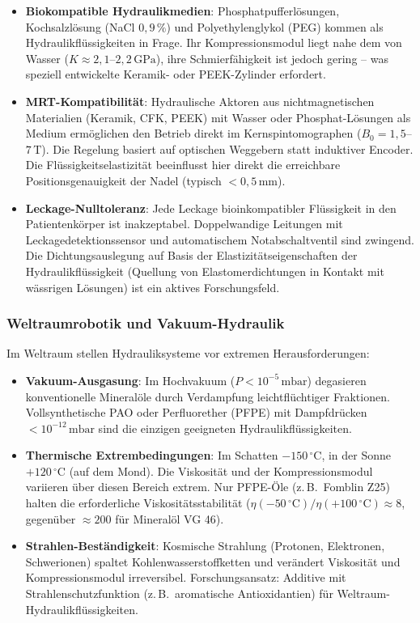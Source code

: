 ﻿\documentclass[a4paper,12pt]{scrreprt}
\theoremstyle{definition}
\begin{document}
\begin{itemize}
  \item \textbf{Biokompatible Hydraulikmedien}: Phosphatpuffer\-lösungen,
    Kochsalzlösung (NaCl $0{,}9\,\%$) und Polyethylenglykol (PEG)
    kommen als Hydraulikflüssigkeiten in Frage. Ihr Kompressionsmodul
    liegt nahe dem von Wasser ($K \approx 2{,}1$--$2{,}2\,\mathrm{GPa}$),
    ihre Schmierfähigkeit ist jedoch gering -- was speziell entwickelte
    Keramik- oder PEEK-Zylinder erfordert.
  \item \textbf{MRT-Kompatibilität}: Hydraulische Aktoren aus
    nichtmagnetischen Materialien (Keramik, CFK, PEEK) mit
    Wasser oder Phosphat-Lösungen als Medium ermöglichen den Betrieb
    direkt im Kernspintomographen ($B_0 = 1{,}5$--$7\,\mathrm{T}$).
    Die Regelung basiert auf optischen Weggebern statt induktiver
    Encoder. Die Flüssigkeitselastizität beeinflusst hier direkt
    die erreichbare Positionsgenauigkeit der Nadel (typisch $< 0{,}5\,\mathrm{mm}$).
  \item \textbf{Leckage-Nulltoleranz}: Jede Leckage bioinkompatibler
    Flüssigkeit in den Patientenkörper ist inakzeptabel. Doppelwandige
    Leitungen mit Leckagedetektionssensor und automatischem Notabschalt\-ventil
    sind zwingend. Die Dichtungsauslegung auf Basis der
    Elastizitätseigenschaften der Hydraulikflüssigkeit (Quellung von
    Elastomerdichtungen in Kontakt mit wässrigen Lösungen) ist ein
    aktives Forschungsfeld.
\end{itemize}

\subsubsection{Weltraumrobotik und Vakuum-Hydraulik}

Im Weltraum stellen Hydrauliksysteme vor extremen Heraus\-forderungen:

\begin{itemize}
  \item \textbf{Vakuum-Ausgasung}: Im Hochvakuum ($P < 10^{-5}\,\mathrm{mbar}$)
    degasieren konventionelle Mineralöle durch Verdampfung leicht\-flüchtiger
    Fraktionen. Vollsynthetische PAO oder Perfluorether (PFPE)
    mit Dampfdrücken $< 10^{-12}\,\mathrm{mbar}$ sind die einzigen
    geeigneten Hydraulikflüssigkeiten.
  \item \textbf{Thermische Extrembedingungen}: Im Schatten $-150\,{^\circ}\mathrm{C}$,
    in der Sonne $+120\,{^\circ}\mathrm{C}$ (auf dem Mond). Die Viskosität
    und der Kompressionsmodul variieren über diesen Bereich extrem.
    Nur PFPE-Öle (z.\,B.\ Fomblin Z25) halten die erforderliche
    Viskositätsstabilität ($\eta(-50\,{^\circ}\mathrm{C}) / \eta(+100\,{^\circ}\mathrm{C})
    \approx 8$, gegenüber $\approx 200$ für Mineralöl VG 46).
  \item \textbf{Strahlen-Beständigkeit}: Kosmische Strahlung
    (Protonen, Elektronen, Schwerionen) spaltet Kohlenwasserstoffketten
    und verändert Viskosität und Kompressionsmodul irreversibel.
    Forschungsansatz: Additive mit Strahlenschutzfunktion (z.\,B.\ aromatische
    Antioxidantien) für Weltraum-Hydraulikflüssigkeiten.
\end{itemize}
\end{document}
